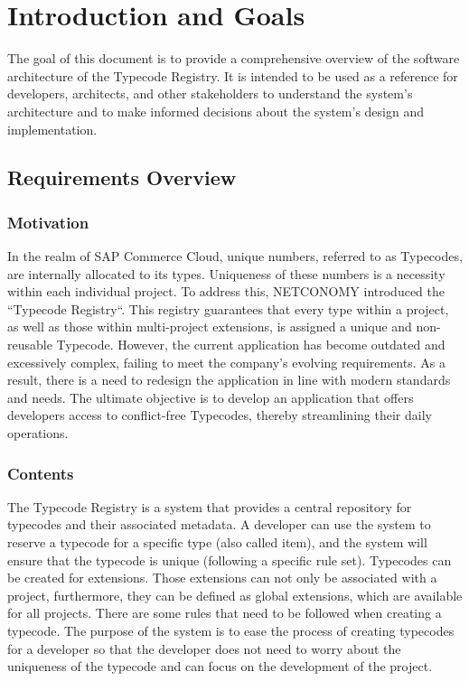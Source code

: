 \section{Introduction and Goals}\label{sec:introduction-and-goals}
The goal of this document is to provide a comprehensive overview of the software architecture of the Typecode Registry.
It is intended to be used as a reference for developers, architects, and other stakeholders to understand
the system's architecture and to make informed decisions about the system's design and implementation.


\subsection{Requirements Overview}\label{subsec:requirements-overview}
\subsubsection{Motivation}\label{subsubsec:motivation}
In the realm of SAP Commerce Cloud, unique numbers, referred to as Typecodes, are internally allocated to its types.
Uniqueness of these numbers is a necessity within each individual project.
To address this, NETCONOMY introduced the
``Typecode Registry``.
This registry guarantees that every type within a project, as well as those within multi-project
extensions, is assigned a unique and non-reusable Typecode.
However, the current application has become outdated
and excessively complex, failing to meet the company's evolving requirements.
As a result, there is a need to redesign
the application in line with modern standards and needs.
The ultimate objective is to develop an application that offers
developers access to conflict-free Typecodes, thereby streamlining their daily operations.

\subsubsection{Contents}\label{subsubsec:contents}
The Typecode Registry is a system that provides a central repository for typecodes and their associated metadata.
A developer can use the system to reserve a typecode for a specific type (also called item), and the system will ensure
that the typecode is unique (following a specific rule set).
Typecodes can be created for extensions.
Those extensions can not only be associated with a project,
furthermore, they can be defined as global extensions, which are available for all projects.
There are some rules that need to be followed when creating a typecode.
The purpose of the system is to ease the process
of creating typecodes for a developer so that the developer does not need to worry about the uniqueness of the typecode
and can focus on the development of the project.

